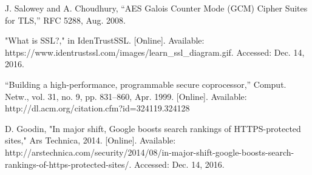 \documentclass[journal]{IEEEtran}
\begin{document}
\begin{thebibliography}{1}
J. Salowey and A. Choudhury, “AES Galois Counter Mode (GCM) Cipher Suites for TLS,” RFC 5288, Aug. 2008.

"What is SSL?," in IdenTrustSSL. [Online]. Available: https://www.identrustssl.com/images/learn\_ssl\_diagram.gif. Accessed: Dec. 14, 2016.

“Building a high-performance, programmable secure coprocessor,” Comput.
Netw., vol. 31, no. 9, pp. 831–860, Apr. 1999. [Online]. Available:
http://dl.acm.org/citation.cfm?id=324119.324128

D. Goodin, "In major shift, Google boosts search rankings of HTTPS-protected sites," Ars Technica, 2014. [Online]. Available: http://arstechnica.com/security/2014/08/in-major-shift-google-boosts-search-rankings-of-https-protected-sites/. Accessed: Dec. 14, 2016.

\end{thebibliography}


\end{document}
